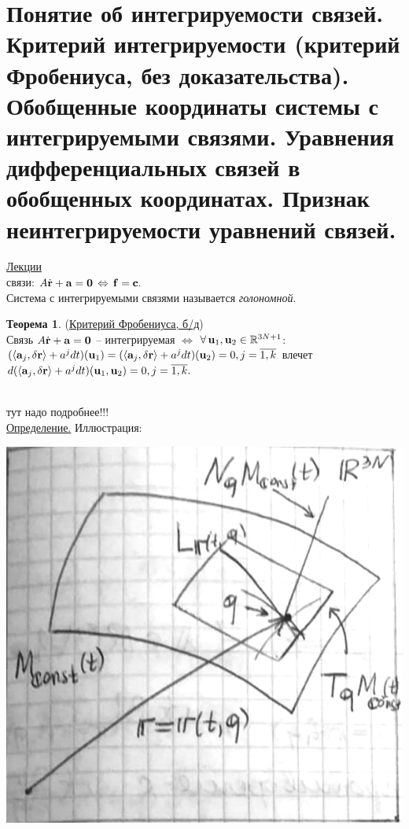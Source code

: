 \documentclass[specialist, subf, href, colorlinks=true, 12pt, times, mtpro, final]{disser}
\theoremstyle{definition}
\newtheorem{theorem}{Теорема}[section]
\def\note{\textcolor{faded}}
\def\bfrd{\dot{\bfr}}
\def\bfzero{\mathbf{0}}
\begin{document}
    \section{Понятие об интегрируемости связей. Критерий интегрируемости (критерий Фробениуса, без доказательства). Обобщенные координаты системы с интегрируемыми связями. Уравнения дифференциальных связей в обобщенных координатах. Признак неинтегрируемости уравнений связей.}
    \label{2}
	\hyperlink {first_lects.7}{Лекции} \\
	{ связи:} $A\bfrd+\bfa=\bfzero\,\Leftrightarrow\,\bff=\bfc.$\\
	Система с интегрируемыми связями называется {\it голономной}.
	\begin{theorem} (\hyperlink{first_lects.7}{Критерий Фробениуса, \note{б/д}})\\
	Связь $A\bfrd+\bfa=\bfzero$ -- интегрируемая $\Longleftrightarrow$
	$\forall\,\mathbf{u}_1,\mathbf{u}_2\in\mathbb{R}^{3N+1}$:\\ $(\langle\mathbf{a}_j,\delta\mathbf{r}\rangle+a^jdt)(\mathbf{u}_1) =
	(\langle\mathbf{a}_j,\delta\mathbf{r}\rangle+a^jdt)(\mathbf{u}_2) = 0, j=\overline{1,k}$ влечет\\
	$d(\langle\mathbf{a}_j,\delta\mathbf{r}\rangle+a^jdt)(\mathbf{u}_1,\mathbf{u}_2)=0, j=\overline{1,k}.$
	\end{theorem}
	\\
	\note{тут надо подробнее!!!}\\
	\hyperlink{first_lects.8}{Определение.} Иллюстрация:\\
    \begin{center}
    \includegraphics[scale=0.35]{pics/gen_coords}
    \end{center}
\end{document}
